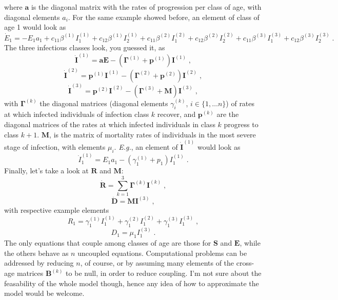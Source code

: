 \documentclass[12pt,a4paper]{article}
\begin{document}
where $\mathbf{a}$ is the diagonal matrix with the rates of progression per class of age, with diagonal elements $a_i$. For the same example showed before, an element of class of age 1 would look as
\begin{displaymath}
\dot{E}_1 = - E_1 a_{1} + c_{11}\beta^{(1)}I^{(1)}_1 + c_{12}\beta^{(1)}I^{(1)}_2 + c_{11}\beta^{(2)}I^{(2)}_1 + c_{12}\beta^{(2)}I^{(2)}_2 + c_{11}\beta^{(3)}I^{(3)}_1 + c_{12}\beta^{(3)}I^{(3)}_2 \;.
\end{displaymath}
The three infectious classes look, you guessed it, as
\begin{equation}
\dot{\mathbf{I}}^{(1)} = \mathbf{aE} - (\mathbf{\Gamma}^{(1)} + \mathbf{p}^{(1)})\mathbf{I}^{(1)}\;,
\end{equation}
\begin{equation}
\dot{\mathbf{I}}^{(2)} = \mathbf{p}^{(1)}\mathbf{I}^{(1)} - (\mathbf{\Gamma}^{(2)} + \mathbf{p}^{(2)})\mathbf{I}^{(2)}\;,
\end{equation}
\begin{equation}
\dot{\mathbf{I}}^{(3)} = \mathbf{p}^{(2)}\mathbf{I}^{(2)} - (\mathbf{\Gamma}^{(3)} + \mathbf{M})\mathbf{I}^{(3)}\;,
\end{equation}
with $\mathbf{\Gamma}^{(k)}$ the diagonal matrices (diagonal elements $\gamma_{i}^{(k)}$, $i\in\{1,\dots n\}$) of rates at which infected individuals of infection class $k$ recover, and $\mathbf{p}^{(k)}$ are the diagonal matrices of the rates at which infected individuals in class $k$ progress to class $k+1$. $\mathbf{M}$, is the matrix of mortality rates of individuals in the most severe stage of infection, with elements $\mu_{i}$. \textit{E.g.}, an element of $\dot{\mathbf{I}}^{(1)}$ would look as
\begin{displaymath}
\dot{I}^{(1)}_1 = E_1 a_{1} - (\gamma_{1}^{(1)} + p_{1})I^{(1)}_1\;.
\end{displaymath}
Finally, let's take a look at $\mathbf{R}$ and $\mathbf{M}$: 
\begin{equation}
\dot{\textbf{R}} = \sum_{k=1}^{3}\mathbf{\Gamma}^{(k)}\mathbf{I}^{(k)}\;,
\end{equation}
\begin{equation}
\dot{\textbf{D}} = \mathbf{M}\mathbf{I}^{(3)}\;,
\end{equation}
with respective example elements
\begin{displaymath}
R_1 = \gamma^{(1)}_1 I_1^{(1)} + \gamma^{(2)}_1 I_1^{(2)} + \gamma^{(3)}_1 I_1^{(3)}\;,
\end{displaymath}
\begin{displaymath}
D_1 = \mu_1 I_1^{(3)}\;.
\end{displaymath}
The only equations that couple among classes of age are those for $\mathbf{S}$ and $\mathbf{E}$, while the others behave as $n$ uncoupled equations. Computational problems can be addressed by reducing $n$, of course, or by assuming many elements of the cross-age matrices $\mathbf{B}^{(k)}$ to be null, in order to reduce coupling. I'm not sure about the feasability of the whole model though, hence any idea of how to approximate the model would be welcome.\\
\end{document}
